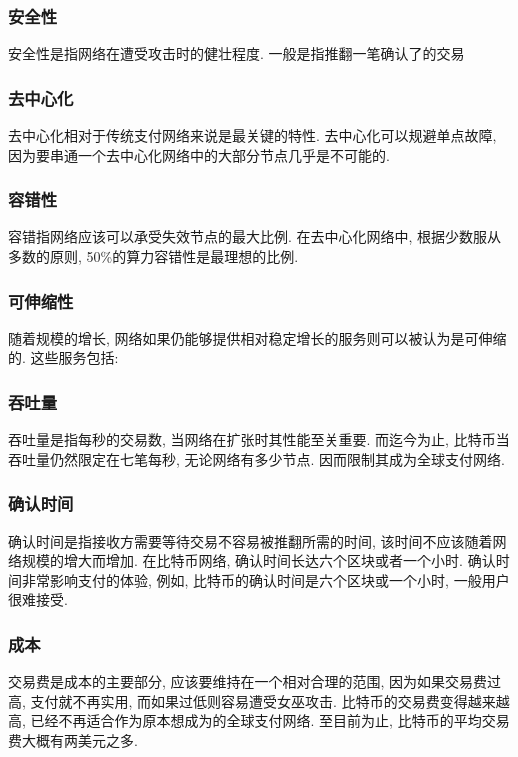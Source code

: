 \documentclass[a4paper,11pt]{article}
\begin{document}
\subsubsection{安全性}
安全性是指网络在遭受攻击时的健壮程度. 一般是指推翻一笔确认了的交易


\subsubsection*{去中心化}
去中心化相对于传统支付网络来说是最关键的特性. 去中心化可以规避单点故障, 因为要串通一个去中心化网络中的大部分节点几乎是不可能的.

\subsubsection*{容错性}
容错指网络应该可以承受失效节点的最大比例. 在去中心化网络中, 根据少数服从多数的原则, 50\%的算力容错性是最理想的比例.

\subsubsection{可伸缩性}
随着规模的增长, 网络如果仍能够提供相对稳定增长的服务则可以被认为是可伸缩的. 这些服务包括:
\subsubsection*{吞吐量}
吞吐量是指每秒的交易数, 当网络在扩张时其性能至关重要. 而迄今为止, 比特币当吞吐量仍然限定在七笔每秒, 无论网络有多少节点. 因而限制其成为全球支付网络.

\subsubsection*{确认时间}

确认时间是指接收方需要等待交易不容易被推翻所需的时间, 该时间不应该随着网络规模的增大而增加.  在比特币网络, 确认时间长达六个区块或者一个小时. 确认时间非常影响支付的体验, 例如, 比特币的确认时间是六个区块或一个小时, 一般用户很难接受.

\subsubsection*{成本}

交易费是成本的主要部分, 应该要维持在一个相对合理的范围, 因为如果交易费过高, 支付就不再实用, 而如果过低则容易遭受女巫攻击. 比特币的交易费变得越来越高, 已经不再适合作为原本想成为的全球支付网络. 至目前为止, 比特币的平均交易费大概有两美元之多.
\end{document}
